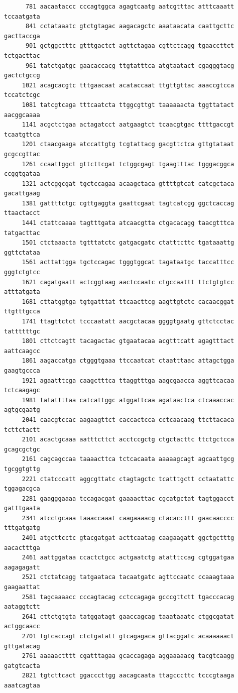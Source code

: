 \documentclass[11pt]{article}
\begin{document}
\begin{verbatim}
      781 aacaataccc cccagtggca agagtcaatg aatcgtttac atttcaaatt tccaatgata
      841 cctataaatc gtctgtagac aagacagctc aaataacata caattgcttc gacttaccga
      901 gctggctttc gtttgactct agttctagaa cgttctcagg tgaaccttct tctgacttac
      961 tatctgatgc gaacaccacg ttgtatttca atgtaatact cgagggtacg gactctgccg
     1021 acagcacgtc tttgaacaat acataccaat ttgttgttac aaaccgtcca tccatctcgc
     1081 tatcgtcaga tttcaatcta ttggcgttgt taaaaaacta tggttatact aacggcaaaa
     1141 acgctctgaa actagatcct aatgaagtct tcaacgtgac ttttgaccgt tcaatgttca
     1201 ctaacgaaga atccattgtg tcgtattacg gacgttctca gttgtataat gcgccgttac
     1261 ccaattggct gttcttcgat tctggcgagt tgaagtttac tgggacggca ccggtgataa
     1321 actcggcgat tgctccagaa acaagctaca gttttgtcat catcgctaca gacattgaag
     1381 gattttctgc cgttgaggta gaattcgaat tagtcatcgg ggctcaccag ttaactacct
     1441 ctattcaaaa tagtttgata atcaacgtta ctgacacagg taacgtttca tatgacttac
     1501 ctctaaacta tgtttatctc gatgacgatc ctatttcttc tgataaattg ggttctataa
     1561 acttattgga tgctccagac tgggtggcat tagataatgc taccatttcc gggtctgtcc
     1621 cagatgaatt actcggtaag aactccaatc ctgccaattt ttctgtgtcc atttatgata
     1681 cttatggtga tgtgatttat ttcaacttcg aagttgtctc cacaacggat ttgtttgcca
     1741 ttagttctct tcccaatatt aacgctacaa ggggtgaatg gttctcctac tattttttgc
     1801 cttctcagtt tacagactac gtgaatacaa acgtttcatt agagtttact aattcaagcc
     1861 aagaccatga ctgggtgaaa ttccaatcat ctaatttaac attagctgga gaagtgccca
     1921 agaatttcga caagctttca ttaggtttga aagcgaacca aggttcacaa tctcaagagc
     1981 tatattttaa catcattggc atggattcaa agataactca ctcaaaccac agtgcgaatg
     2041 caacgtccac aagaagttct caccactcca cctcaacaag ttcttacaca tcttctactt
     2101 acactgcaaa aatttcttct acctccgctg ctgctacttc ttctgctcca gcagcgctgc
     2161 cagcagccaa taaaacttca tctcacaata aaaaagcagt agcaattgcg tgcggtgttg
     2221 ctatcccatt aggcgttatc ctagtagctc tcatttgctt cctaatattc tggagacgca
     2281 gaagggaaaa tccagacgat gaaaacttac cgcatgctat tagtggacct gatttgaata
     2341 atcctgcaaa taaaccaaat caagaaaacg ctacaccttt gaacaacccc tttgatgatg
     2401 atgcttcctc gtacgatgat acttcaatag caagaagatt ggctgctttg aacactttga
     2461 aattggataa ccactctgcc actgaatctg atatttccag cgtggatgaa aagagagatt
     2521 ctctatcagg tatgaataca tacaatgatc agttccaatc ccaaagtaaa gaagaattat
     2581 tagcaaaacc cccagtacag cctccagaga gcccgttctt tgacccacag aataggtctt
     2641 cttctgtgta tatggatagt gaaccagcag taaataaatc ctggcgatat actggcaacc
     2701 tgtcaccagt ctctgatatt gtcagagaca gttacggatc acaaaaaact gttgatacag
     2761 aaaaactttt cgatttagaa gcaccagaga aggaaaaacg tacgtcaagg gatgtcacta
     2821 tgtcttcact ggacccttgg aacagcaata ttagcccttc tcccgtaaga aaatcagtaa

\end{verbatim}
\end{document}
